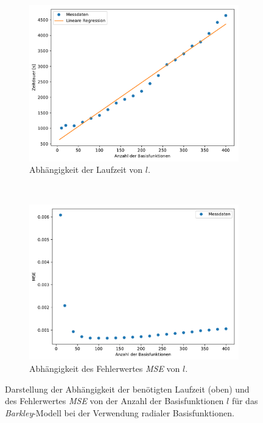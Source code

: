 \begin{figure}[H]
	\centering
	\begin{subfigure}{\textwidth}
		\centering
		\includegraphics[width=4.2in]{figures/results/cross_prediction/rbf_placements_uv_time.pdf}
		\caption{Abhängigkeit der Laufzeit von $l$.}
		\label{fig:exp_cross_rbf_placements_time_barkley}
	\end{subfigure}%
	\\
	\begin{subfigure}{\textwidth}
		\centering
		\includegraphics[width=4.2in]{figures/results/cross_prediction/rbf_placements_uv_mse.pdf}
		\caption{Abhängigkeit des Fehlerwertes \textit{MSE} von $l$.}
		\label{fig:exp_cross_rbf_placements_mse_barkley}
	\end{subfigure}%
	\caption{Darstellung der Abhängigkeit der benötigten Laufzeit (oben) und des Fehlerwertes \textit{MSE} von der Anzahl der Basisfunktionen $l$ für das \textit{Barkley}-Modell bei der Verwendung radialer Basisfunktionen.}
\end{figure}

